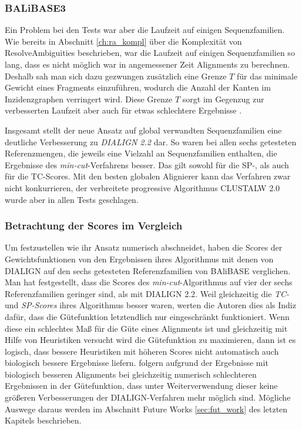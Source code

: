 \subsubsection{BALiBASE3}

Ein Problem bei den Tests war aber die Laufzeit auf einigen Sequenzfamilien. Wie bereits in Abschnitt \ref{ch:ra_kompl} über die Komplexität von \textrm{ResolveAmbiguities} beschrieben, war die Laufzeit auf einigen Sequenzfamilien so lang, dass es nicht möglich war in angemessener Zeit Alignments zu berechnen. Deshalb sah man sich dazu gezwungen zusätzlich eine Grenze $T$ für das minimale Gewicht eines Fragments einzuführen, wodurch die Anzahl der Kanten im Inzidenzgraphen verringert wird. Diese Grenze $T$ sorgt im Gegenzug zur verbesserten Laufzeit aber auch für etwas schlechtere Ergebnisse \cite{cpm10}.

Insgesamt stellt der neue Ansatz auf global verwandten Sequenzfamilien eine deutliche Verbesserung zu \emph{DIALIGN 2.2} dar. So waren bei allen sechs getesteten Referenzmengen, die jeweils eine Vielzahl an Sequenzfamilien enthalten, die Ergebnisse des \emph{min-cut}-Verfahrens besser. Das gilt sowohl für die SP-, als auch für die TC-Scores. Mit den besten globalen Alignierer kann das Verfahren zwar nicht konkurrieren, der verbreitete progressive Algorithmus CLUSTALW 2.0 wurde aber in allen Tests geschlagen. 

\subsubsection{Betrachtung der Scores im Vergleich}

Um festzustellen wie ihr Ansatz numerisch abschneidet, haben \cite{cpm10} die Scores der Gewichtsfunktionen von den Ergebnissen ihres Algorithmus mit denen von DIALIGN auf den sechs getesteten Referenzfamilien von BAliBASE verglichen. Man hat festgestellt, dass die Scores des \emph{min-cut}-Algorithmus auf vier der sechs Referenzfamilien geringer sind, als mit DIALIGN 2.2. Weil gleichzeitig die \emph{TC-} und \emph{SP-Scores} ihres Algorithmus besser waren, werten die Autoren dies als Indiz dafür, dass die Gütefunktion letztendlich nur eingeschränkt funktioniert. Wenn diese ein schlechtes Maß für die Güte eines Alignments ist und gleichzeitig mit Hilfe von Heuristiken versucht wird die Gütefunktion zu maximieren, dann ist es logisch, dass bessere Heuristiken mit höheren Scores nicht automatisch auch biologisch bessere Ergebnisse liefern. \cite{cpm10} folgern aufgrund der Ergebnisse mit biologisch besseren Alignments bei gleichzeitig numerisch schlechteren Ergebnissen in der Gütefunktion, dass unter Weiterverwendung dieser keine größeren Verbesserungen der DIALIGN-Verfahren mehr möglich sind. Mögliche Auswege daraus werden im Abschnitt Future Works \ref{sec:fut_work} des letzten Kapitels beschrieben.

